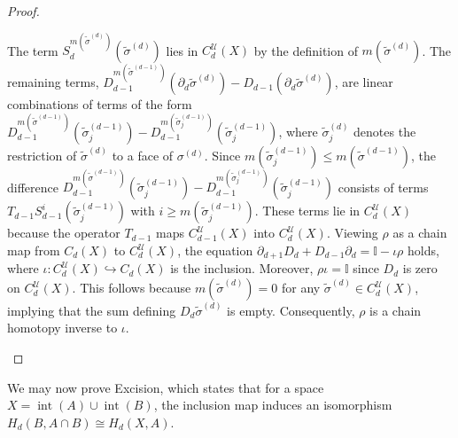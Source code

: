 \begin{proof}
\begin{enumerate}
	The term \( S_d^{m(\tilde{\sigma}^{(d)})}(\tilde{\sigma}^{(d)}) \) lies in \( C_d^{\mathcal{U}}(X) \) by the definition of \( m(\tilde{\sigma}^{(d)}) \). The remaining terms, \( D_{d-1}^{m(\tilde{\sigma}^{(d-1)})}(\partial_d \tilde{\sigma}^{(d)}) - D_{d-1}(\partial_d \tilde{\sigma}^{(d)}) \), are linear combinations of terms of the form \( D_{d-1}^{m(\tilde{\sigma}^{(d-1)})}(\tilde{\sigma}^{(d-1)}_j) - D_{d-1}^{m(\tilde{\sigma}^{(d-1)}_j)}(\tilde{\sigma}^{(d-1)}_j) \), where \( \tilde{\sigma}^{(d)}_j \) denotes the restriction of \( \tilde{\sigma}^{(d)} \) to a face of \( \sigma^{(d)} \). Since \( m(\tilde{\sigma}^{(d-1)}_j) \leq m(\tilde{\sigma}^{(d-1)}) \), the difference \( D^{m(\tilde{\sigma}^{(d-1)})}_{d-1}(\tilde{\sigma}^{(d-1)}_j) - D_{d-1}^{m(\tilde{\sigma}^{(d-1)}_j)}(\tilde{\sigma}^{(d-1)}_j) \) consists of terms \( T_{d-1} S^i_{d-1}(\tilde{\sigma}^{(d-1)}_j) \) with \( i \geq m(\tilde{\sigma}^{(d-1)}_j) \). These terms lie in \( C_d^{\mathcal{U}}(X) \) because the operator \( T_{d-1} \) maps \( C_{d-1}^{\mathcal{U}}(X) \) into \( C_d^{\mathcal{U}}(X) \). Viewing \( \rho \) as a chain map from \( C_d(X) \) to \( C_d^{\mathcal{U}}(X) \), the equation $\partial_{d+1} D_{d} + D_{d-1} \partial_{d} = \mathbb{I} - \iota \rho$ holds, where \( \iota : C_d^{\mathcal{U}}(X) \hookrightarrow C_d(X) \) is the inclusion. Moreover, \( \rho \iota = \mathbb{I} \) since \( D_d \) is zero on \( C_d^{\mathcal{U}}(X) \). This follows because \( m(\tilde{\sigma}^{(d)}) = 0 \) for any \( \tilde{\sigma}^{(d)} \in C_d^{\mathcal{U}}(X) \), implying that the sum defining \( D_d\tilde{\sigma}^{(d)} \) is empty. Consequently, \( \rho \) is a chain homotopy inverse to \( \iota \).
\end{enumerate}
\end{proof}

We may now prove Excision, which states that for a space \( X = \operatorname{int}(A) \cup \operatorname{int}(B) \), the inclusion map induces an isomorphism \( H_d(B, A \cap B) \cong H_d(X, A) \).

